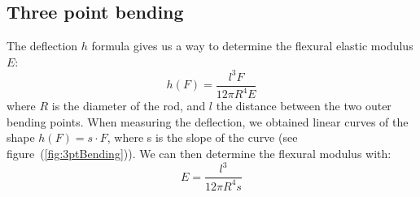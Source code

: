 \documentclass{scrartcl}
\begin{document}
\subsection{Three point bending}
The deflection $h$ formula gives us a way to determine the flexural elastic modulus $E$: \begin{equation}
    h(F) = \frac{l^3 F}{12 \pi R^4 E}
\end{equation} where $R$ is the diameter of the rod, and $l$ the distance between the two outer bending points. When measuring the deflection, we obtained linear curves of the shape $h(F) = s \cdot F$, where s is the slope of the curve (see figure~(\ref{fig:3ptBending})). We can then determine the flexural modulus with: \begin{equation}
    E = \frac{l^3}{12 \pi R^4 s}
\end{equation}
\end{document}
